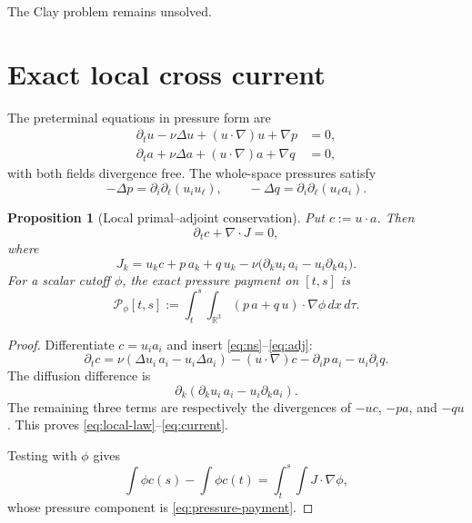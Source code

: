 \documentclass[11pt]{article}
\newtheorem{proposition}[theorem]{Proposition}
\theoremstyle{remark}
\newcommand{\R}{\mathbb R}
\begin{document}
The Clay problem remains unsolved.

\section{Exact local cross current}

The preterminal equations in pressure form are
\begin{align}
 \label{eq:ns}
 \partial_tu-\nu\Delta u+(u\cdot\nabla)u+\nabla p&=0,\\
 \label{eq:adj}
 \partial_ta+\nu\Delta a+(u\cdot\nabla)a+\nabla q&=0,
\end{align}
with both fields divergence free.  The whole-space pressures satisfy
\begin{equation}
 \label{eq:pressures}
 -\Delta p=\partial_i\partial_\ell(u_i u_\ell),
 \qquad
 -\Delta q=\partial_i\partial_\ell(u_\ell a_i).
\end{equation}

\begin{proposition}[Local primal--adjoint conservation]
\label{prop:local}
Put \(c:=u\cdot a\).  Then
\begin{equation}
 \label{eq:local-law}
 \partial_tc+\nabla\cdot J=0,
\end{equation}
where
\begin{equation}
 \label{eq:current}
 \boxed{
 J_k
 =
 u_kc+p\,a_k+q\,u_k
 -\nu\bigl(\partial_ku_i\,a_i-u_i\partial_ka_i\bigr).
 }
\end{equation}
For a scalar cutoff \(\phi\), the exact pressure payment on
\([t,s]\) is
\begin{equation}
 \label{eq:pressure-payment}
 \mathcal P_\phi[t,s]
 :=
 \int_t^s\int_{\R^3}
 (p\,a+q\,u)\cdot\nabla\phi\,dx\,d\tau.
\end{equation}
\end{proposition}

\begin{proof}
Differentiate \(c=u_i a_i\) and insert
\eqref{eq:ns}--\eqref{eq:adj}:
\[
 \partial_tc
 =
 \nu(\Delta u_i\,a_i-u_i\Delta a_i)
 -(u\cdot\nabla)c
 -\partial_i p\,a_i-u_i\partial_iq.
\]
The diffusion difference is
\[
 \partial_k(\partial_ku_i\,a_i-u_i\partial_ka_i).
\]
The remaining three terms are respectively the divergences of
\(-uc\), \(-pa\), and \(-qu\).  This proves
\eqref{eq:local-law}--\eqref{eq:current}.

Testing with \(\phi\) gives
\begin{equation}
 \label{eq:cutoff-law}
 \int\phi c(s)-\int\phi c(t)
 =
 \int_t^s\int J\cdot\nabla\phi,
\end{equation}
whose pressure component is \eqref{eq:pressure-payment}.
\end{proof}
\end{document}
